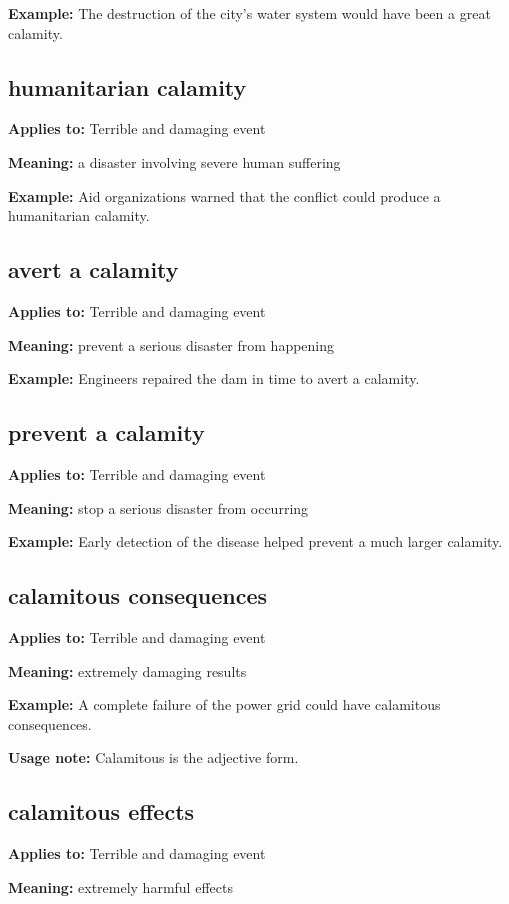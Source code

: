 \documentclass[11pt]{article}
\begin{document}
\textbf{Example:} The destruction of the city's water system would have been a great calamity.

\subsection{humanitarian calamity}
\textbf{Applies to:} Terrible and damaging event

\textbf{Meaning:} a disaster involving severe human suffering

\textbf{Example:} Aid organizations warned that the conflict could produce a humanitarian calamity.

\subsection{avert a calamity}
\textbf{Applies to:} Terrible and damaging event

\textbf{Meaning:} prevent a serious disaster from happening

\textbf{Example:} Engineers repaired the dam in time to avert a calamity.

\subsection{prevent a calamity}
\textbf{Applies to:} Terrible and damaging event

\textbf{Meaning:} stop a serious disaster from occurring

\textbf{Example:} Early detection of the disease helped prevent a much larger calamity.

\subsection{calamitous consequences}
\textbf{Applies to:} Terrible and damaging event

\textbf{Meaning:} extremely damaging results

\textbf{Example:} A complete failure of the power grid could have calamitous consequences.

\textbf{Usage note:} Calamitous is the adjective form.

\subsection{calamitous effects}
\textbf{Applies to:} Terrible and damaging event

\textbf{Meaning:} extremely harmful effects
\end{document}
